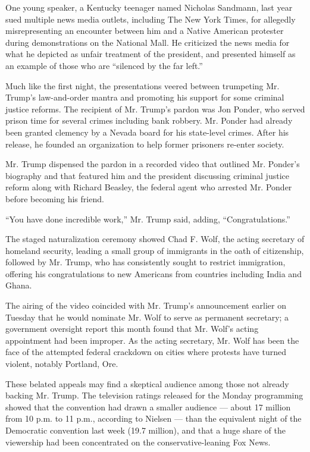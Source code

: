 One young speaker, a Kentucky teenager named Nicholas Sandmann, last
year sued multiple news media outlets, including The New York Times, for
allegedly misrepresenting an encounter between him and a Native American
protester during demonstrations on the National Mall. He criticized the
news media for what he depicted as unfair treatment of the president,
and presented himself as an example of those who are ``silenced by the
far left.''

Much like the first night, the presentations veered between trumpeting
Mr. Trump's law-and-order mantra and promoting his support for some
criminal justice reforms. The recipient of Mr. Trump's pardon was Jon
Ponder, who served prison time for several crimes including bank
robbery. Mr. Ponder had already been granted clemency by a Nevada board
for his state-level crimes. After his release, he founded an
organization to help former prisoners re-enter society.

Mr. Trump dispensed the pardon in a recorded video that outlined Mr.
Ponder's biography and that featured him and the president discussing
criminal justice reform along with Richard Beasley, the federal agent
who arrested Mr. Ponder before becoming his friend.

``You have done incredible work,'' Mr. Trump said, adding,
``Congratulations.''

The staged naturalization ceremony showed Chad F. Wolf, the acting
secretary of homeland security, leading a small group of immigrants in
the oath of citizenship, followed by Mr. Trump, who has consistently
sought to restrict immigration, offering his congratulations to new
Americans from countries including India and Ghana.

The airing of the video coincided with Mr. Trump's announcement earlier
on Tuesday that he would nominate Mr. Wolf to serve as permanent
secretary; a government oversight report this month found that Mr.
Wolf's acting appointment had been improper. As the acting secretary,
Mr. Wolf has been the face of the attempted federal crackdown on cities
where protests have turned violent, notably Portland, Ore.

These belated appeals may find a skeptical audience among those not
already backing Mr. Trump. The television ratings released for the
Monday programming showed that the convention had drawn a smaller
audience --- about 17 million from 10 p.m. to 11 p.m., according to
Nielsen --- than the equivalent night of the Democratic convention last
week (19.7 million), and that a huge share of the viewership had been
concentrated on the conservative-leaning Fox News.

